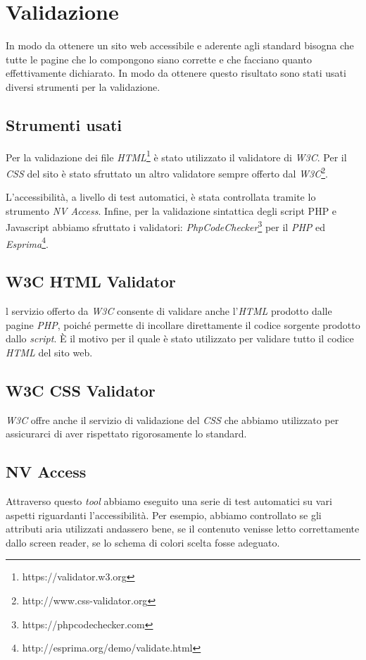 \section{Validazione}\label{sec:validazione}
In modo da ottenere un sito web accessibile e aderente agli standard bisogna che tutte le pagine che lo compongono siano corrette e che facciano quanto effettivamente dichiarato. In modo da ottenere questo risultato sono stati usati diversi strumenti per la validazione.
\subsection{Strumenti usati}
Per la validazione dei file \textit{HTML}\footnote{https://validator.w3.org} è stato utilizzato il validatore di \textit{W3C}. Per il \textit{CSS} del sito è stato sfruttato un altro validatore sempre offerto dal \textit{W3C}\footnote{http://www.css-validator.org}.

L’accessibilità, a livello di test automatici, è stata controllata tramite lo strumento \textit{NV Access}. Infine, per la validazione sintattica degli script PHP e Javascript abbiamo sfruttato i validatori: \textit{PhpCodeChecker}\footnote{https://phpcodechecker.com} per il \textit{PHP} ed \textit{Esprima}\footnote{http://esprima.org/demo/validate.html}.

\subsection{W3C HTML Validator}
l servizio offerto da \textit{W3C} consente di validare anche l’\textit{HTML} prodotto dalle pagine \textit{PHP}, poiché permette di incollare direttamente il codice sorgente prodotto dallo \textit{script}. È il motivo per il quale è stato utilizzato per validare tutto il codice \textit{HTML} del sito web.

\subsection{W3C CSS Validator}
\textit{W3C} offre anche il servizio di validazione del \textit{CSS} che abbiamo utilizzato per assicurarci di aver rispettato rigorosamente lo standard.

\subsection{NV Access}
Attraverso questo \textit{tool} abbiamo eseguito una serie di test automatici su vari aspetti riguardanti l’accessibilità. Per esempio, abbiamo controllato se gli attributi aria utilizzati andassero bene, se il contenuto venisse letto correttamente dallo screen reader, se lo schema di colori scelta fosse adeguato.

